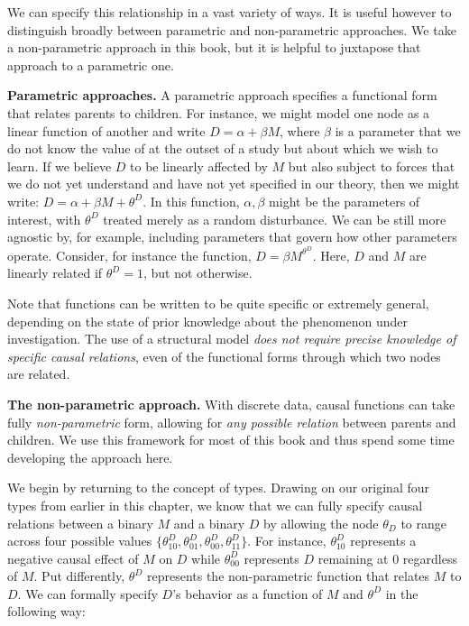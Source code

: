 \documentclass[
  12pt,
]{book}
\begin{document}
We can specify this relationship in a vast variety of ways. It is useful however to distinguish broadly between parametric and non-parametric approaches. We take a non-parametric approach in this book, but it is helpful to juxtapose that approach to a parametric one.

\textbf{Parametric approaches.} A parametric approach specifies a functional form that relates parents to children. For instance, we might model one node as a linear function of another and write \(D=\alpha + \beta M\), where \(\beta\) is a parameter that we do not know the value of at the outset of a study but about which we wish to learn. If we believe \(D\) to be linearly affected by \(M\) but also subject to forces that we do not yet understand and have not yet specified in our theory, then we might write: \(D=\alpha + \beta M+\theta^D\). In this function, \(\alpha, \beta\) might be the parameters of interest, with \(\theta^D\) treated merely as a random disturbance. We can be still more agnostic by, for example, including parameters that govern how other parameters operate. Consider, for instance the function, \(D=\beta M^{\theta^D}\). Here, \(D\) and \(M\) are linearly related if \(\theta^D=1\), but not otherwise.

Note that functions can be written to be quite specific or extremely general, depending on the state of prior knowledge about the phenomenon under investigation. The use of a structural model \emph{does not require precise knowledge of specific causal relations}, even of the functional forms through which two nodes are related.

\textbf{The non-parametric approach.} With discrete data, causal functions can take fully \emph{non-parametric} form, allowing for \emph{any possible relation} between parents and children. We use this framework for most of this book and thus spend some time developing the approach here.

We begin by returning to the concept of types. Drawing on our original four types from earlier in this chapter, we know that we can fully specify causal relations between a binary \(M\) and a binary \(D\) by allowing the node \(\theta_D\) to range across four possible values \(\{\theta^D_{10}, \theta^D_{01}, \theta^D_{00}, \theta^D_{11}\}\). For instance, \(\theta^D_{10}\) represents a negative causal effect of \(M\) on \(D\) while \(\theta^D_{00}\) represents \(D\) remaining at 0 regardless of \(M\). Put differently, \(\theta^D\) represents the non-parametric function that relates \(M\) to \(D\). We can formally specify \(D\)'s behavior as a function of \(M\) and \(\theta^D\) in the following way:
\end{document}
